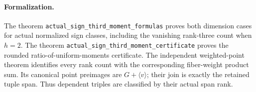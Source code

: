 \paragraph{Formalization.} The theorem \texttt{actual\_\allowbreak sign\_\allowbreak third\_\allowbreak moment\_\allowbreak formulas} proves both dimension cases for actual normalized sign classes, including the vanishing rank-three count when $h=2$. The theorem \texttt{actual\_\allowbreak sign\_\allowbreak third\_\allowbreak moment\_\allowbreak certificate} proves the rounded ratio-of-uniform-moments certificate. The independent weighted-point theorem identifies every rank count with the corresponding fiber-weight product sum. Its canonical point preimages are $G+\langle v\rangle$; their join is exactly the retained tuple span. Thus dependent triples are classified by their actual span rank.
